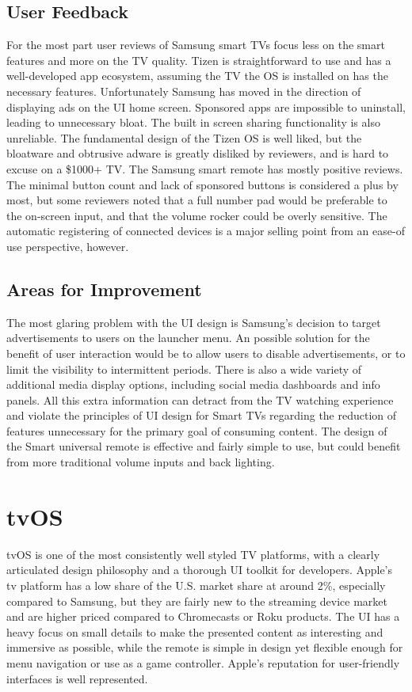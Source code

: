 \documentclass[12pt, letterpaper]{article}
\begin{document}
\subsection{User Feedback}
For the most part user reviews of Samsung smart TVs focus less on the smart features and more on the TV quality. Tizen is straightforward to use and has a well-developed app ecosystem, assuming the TV the OS is installed on has the necessary features. Unfortunately Samsung has moved in the direction of displaying ads on the UI home screen.  Sponsored apps are impossible to uninstall, leading to unnecessary bloat. The built in screen sharing functionality is also unreliable. The fundamental design of the Tizen OS is well liked, but the bloatware and obtrusive adware is greatly disliked by reviewers, and is hard to excuse on a \$1000+ TV.
The Samsung smart remote has mostly positive reviews.  The minimal button count and lack of sponsored buttons is considered a plus by most, but some reviewers noted that a full number pad would be preferable to the on-screen input, and that the volume rocker could be overly sensitive. The automatic registering of connected devices is a major selling point from an ease-of use perspective, however. 
\subsection{Areas for Improvement}
The most glaring problem with the UI design is Samsung's decision to target advertisements to users on the launcher menu\cite{smith_2019}.  An possible solution for the benefit of user interaction would be to allow users to disable advertisements, or to limit the visibility to intermittent periods. There is also a wide variety of additional media display options, including social media dashboards and info panels. All this extra information can detract from the TV watching experience and violate the principles of UI design for Smart TVs regarding the reduction of features unnecessary for the primary goal of consuming content.
The design of the Smart universal remote is effective and fairly simple to use, but could benefit from more traditional volume inputs and back lighting.
\section{tvOS}
tvOS is one of the most consistently well styled TV platforms, with a clearly articulated design philosophy and a thorough UI toolkit for developers.  Apple's tv platform has a low share of the U.S. market share at around 2\%, especially compared to Samsung, but they are fairly new to the streaming device market and are higher priced compared to Chromecasts or Roku products. The UI has a heavy focus on small details to make the presented content as interesting and immersive as possible, while the remote is simple in design yet flexible enough for menu navigation or use as a game controller. Apple's reputation for 
user-friendly interfaces is well represented.
\end{document}
